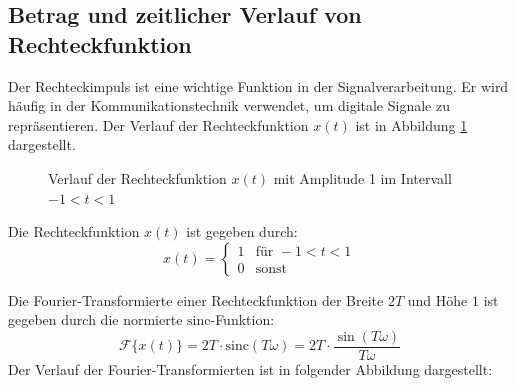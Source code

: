\subsection{Betrag und zeitlicher Verlauf von Rechteckfunktion}
Der Rechteckimpuls ist eine wichtige Funktion in der Signalverarbeitung.
Er wird häufig in der Kommunikationstechnik verwendet, um digitale Signale zu repräsentieren.
Der Verlauf der Rechteckfunktion $x(t)$ ist in Abbildung \ref{fig:rechteck} dargestellt.
\begin{figure}[H]
    \centering
    \caption{Verlauf der Rechteckfunktion $x(t)$ mit Amplitude 1 im Intervall $-1 < t < 1$}
    \label{fig:rechteck}
\end{figure}

Die Rechteckfunktion $x(t)$ ist gegeben durch:
\[
x(t) = \begin{cases}
    1 & \text{für } -1 < t < 1 \\
    0 & \text{sonst}
    \end{cases}
\]
    
Die Fourier-Transformierte einer Rechteckfunktion der Breite $2T$ und Höhe $1$ ist gegeben durch die normierte $\mathrm{sinc}$-Funktion:
\[
\mathcal{F}\{x(t)\} = 2T \cdot \mathrm{sinc}(T\omega) = 2T \cdot \frac{\sin(T\omega)}{T\omega}
\]
Der Verlauf der Fourier-Transformierten ist in folgender Abbildung dargestellt:

